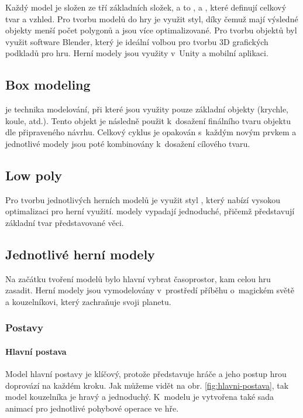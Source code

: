 Každý model je složen ze tří základních složek, a to ,  a , které definují celkový tvar a vzhled. Pro tvorbu modelů do hry je využit  \cite{LowPoly} styl, díky čemuž mají výsledné objekty menší počet polygonů a jsou více optimalizované. Pro tvorbu objektů byl využit software Blender, který je ideální volbou pro tvorbu 3D grafických podkladů pro hru. Herní modely jsou využity v~Unity a mobilní aplikaci.

\subsection{Box modeling}
 \cite{BoxModeling} je technika modelování, při které jsou využity pouze základní objekty (krychle, koule, atd.). Tento objekt je následně použit k~dosažení finálního tvaru objektu dle připraveného návrhu. Celkový cyklus je opakován s~každým novým prvkem a jednotlivé modely jsou poté kombinovány k~dosažení cílového tvaru.

\subsection{Low poly}
Pro tvorbu jednotlivých herních modelů je využit styl  \cite{LowPoly}, který nabízí vysokou optimalizaci pro herní využití.  modely vypadají jednoduché, přičemž představují základní tvar představované věci.

\subsection{Jednotlivé herní modely}
Na začátku tvoření modelů bylo hlavní vybrat časoprostor, kam celou hru zasadit. Herní modely jsou vymodelovány v~prostředí příběhu o~magickém světě a kouzelníkovi, který zachraňuje svoji planetu.

\subsubsection{Postavy}
\paragraph{Hlavní postava}
Model hlavní postavy je klíčový, protože představuje hráče a jeho postup hrou doprovází na každém kroku. Jak můžeme vidět na obr. \ref{fig:hlavni-postava}, tak model kouzelníka je hravý a jednoduchý. K~modelu je vytvořena také sada animací pro jednotlivé pohybové operace ve hře.

